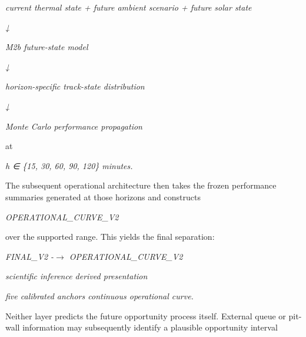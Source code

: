 \begin{center}\textit{current thermal state + future ambient scenario + future solar state}\end{center}

\begin{center}\textit{↓}\end{center}

\begin{center}\textit{M2b future-state model}\end{center}

\begin{center}\textit{↓}\end{center}

\begin{center}\textit{horizon-specific track-state distribution}\end{center}

\begin{center}\textit{↓}\end{center}

\begin{center}\textit{Monte Carlo performance propagation}\end{center}

at

\begin{center}\textit{h ∈ \{15, 30, 60, 90, 120\} minutes.}\end{center}

The subsequent operational architecture then takes the frozen performance summaries generated at those horizons and constructs

\begin{center}\textit{OPERATIONAL\_CURVE\_V2}\end{center}

over the supported range. This yields the final separation:

\begin{center}\textit{FINAL\_V2        -\ensuremath{\rightarrow}   OPERATIONAL\_CURVE\_V2}\end{center}

\begin{center}\textit{scientific inference        derived presentation}\end{center}

\begin{center}\textit{five calibrated anchors    continuous operational curve.}\end{center}

Neither layer predicts the future opportunity process itself. External queue or pit-wall information may subsequently identify a plausible opportunity interval

